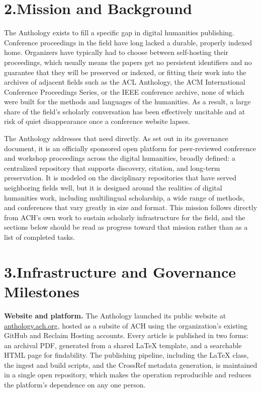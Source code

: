 \documentclass[11pt]{article}
\begin{document}
\section*{2.\quad Mission and Background}

The Anthology exists to fill a specific gap in digital humanities publishing. Conference proceedings in the field have long lacked a durable, properly indexed home. Organizers have typically had to choose between self-hosting their proceedings, which usually means the papers get no persistent identifiers and no guarantee that they will be preserved or indexed, or fitting their work into the archives of adjacent fields such as the ACL Anthology, the ACM International Conference Proceedings Series, or the IEEE conference archive, none of which were built for the methods and languages of the humanities. As a result, a large share of the field's scholarly conversation has been effectively uncitable and at risk of quiet disappearance once a conference website lapses.

The Anthology addresses that need directly. As set out in its governance document, it is an officially sponsored open platform for peer-reviewed conference and workshop proceedings across the digital humanities, broadly defined: a centralized repository that supports discovery, citation, and long-term preservation. It is modeled on the disciplinary repositories that have served neighboring fields well, but it is designed around the realities of digital humanities work, including multilingual scholarship, a wide range of methods, and conferences that vary greatly in size and format. This mission follows directly from ACH's own work to sustain scholarly infrastructure for the field, and the sections below should be read as progress toward that mission rather than as a list of completed tasks.

\section*{3.\quad Infrastructure and Governance Milestones}

\textbf{Website and platform.} The Anthology launched its public website at \href{https://anthology.ach.org/}{anthology.ach.org}, hosted as a subsite of ACH using the organization's existing GitHub and Reclaim Hosting accounts. Every article is published in two forms: an archival PDF, generated from a shared LaTeX template, and a searchable HTML page for findability. The publishing pipeline, including the LaTeX class, the ingest and build scripts, and the CrossRef metadata generation, is maintained in a single open repository, which makes the operation reproducible and reduces the platform's dependence on any one person.
\end{document}
